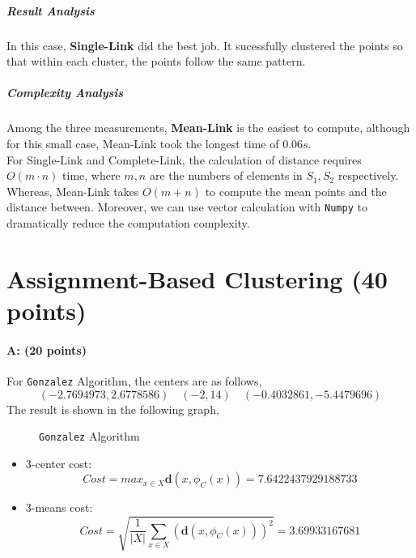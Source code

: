 \documentclass[11pt]{article}
\begin{document}
\subparagraph{Result Analysis}
In this case, \textbf{Single-Link} did the best job. It sucessfully clustered the points so that within each cluster, the points follow the same pattern.
\subparagraph{Complexity Analysis}
Among the three measurements, \textbf{Mean-Link} is the easiest to compute, although for this small case, Mean-Link took the longest time of $0.06s$.\\
For Single-Link and Complete-Link, the calculation of distance requires $O(m\cdot n)$ time, where $m, n$ are the numbers of elements in $S_1, S_2$ respectively. Whereas, Mean-Link takes $O(m+n)$ to compute the mean points and the distance between. Moreover, we can use vector calculation with \texttt{Numpy} to dramatically reduce the computation complexity.

\section{Assignment-Based Clustering (40 points)}

\paragraph{A: (20 points)}
 
For \texttt{Gonzalez} Algorithm, the centers are as follows,
$$(-2.7694973, 2.6778586) \quad (-2, 14) \quad (-0.4032861, -5.4479696)$$
The result is shown in the following graph,
\begin{figure}[H]
\caption{\texttt{Gonzalez} Algorithm}
\label{fig:name}
\end{figure}
\begin{itemize}
\item 3-center cost:
$$Cost=max_{x\in X}\mathbf{d}(x, \phi_C(x))=7.6422437929188733$$
\item 3-means cost:
$$Cost=\sqrt{\frac{1}{|X|}\sum_{x\in X}(\mathbf{d}(x, \phi_C(x)))^2}=3.69933167681$$
\end{itemize}
\end{document}
